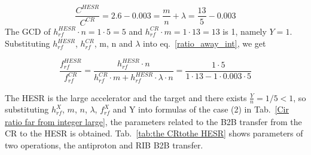\begin{equation}
\frac{C^{\mathit{HESR}}}{C^{\mathit{CR}}}=2.6-0.003=\frac{m}{n}+ \lambda = \frac{13}{5}-0.003
\end{equation}
The GCD of $h^{\mathit{HESR}}_\mathit{rf}\cdot n=1\cdot5=5$ and $h^{\mathit{CR}}_\mathit{rf} \cdot m=1\cdot 13=13$ is 1, namely $Y=1$. Substituting $h^{\mathit{HESR}}_\mathit{rf}$, $h^{\mathit{CR}}_\mathit{rf}$, m, n and $\lambda$ into eq.~\ref{ratio_away_int}, we get

\begin{equation} 
\frac{f_{\mathit{rf}}^{\mathit{HESR}}}{f_{\mathit{rf}}^{\mathit{CR}}}=\frac{h^{\mathit{HESR}}_\mathit{rf}\cdot n}{h^{\mathit{CR}}_\mathit{rf} \cdot m+ h^{\mathit{HESR}}_\mathit{rf} \cdot\lambda\cdot n}=\frac{1\cdot 5}{1 \cdot 13- 1 \cdot 0.003\cdot 5}
\end{equation}

The HESR is the large accelerator and the target and there exists $\frac{Y}{n}=1/5<1$, so substituting $h^X_\mathit{rf}$, $m$, $n$, $\lambda$, $f_{\mathit{rf}}^{X}$ and Y into formulas of the case (2) in Tab.~\ref{Cir ratio far from integer large}, the parameters related to the B2B transfer from the CR to the HESR is obtained. Tab.~\ref{tab:the CRtothe HESR} shows parameters of two operations, the antiproton and RIB B2B transfer.


